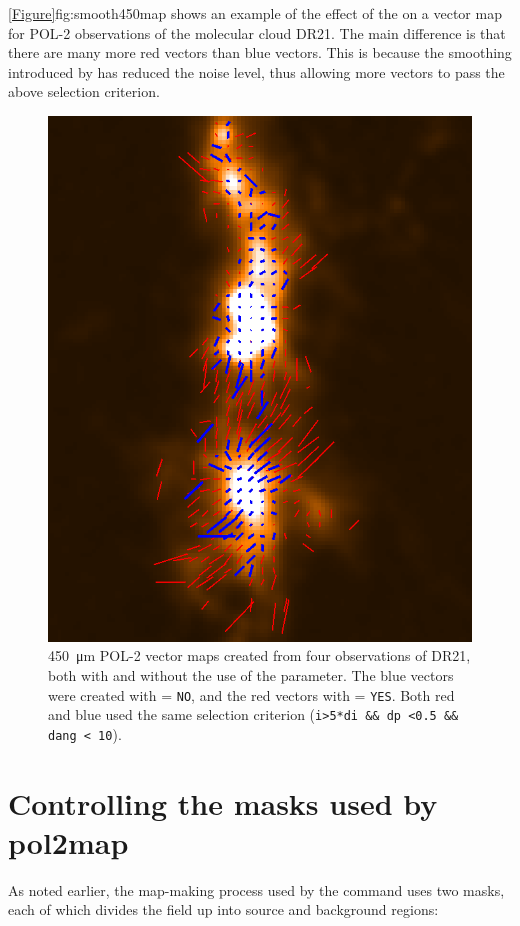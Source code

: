 \cref{Figure}{fig:smooth450map}{} shows an example of the effect of the  on a vector map for POL-2 observations of the molecular cloud DR21. The main difference is that there are many more red vectors than blue vectors. This is because the smoothing introduced by  has reduced the noise level, thus allowing more vectors to pass the above selection criterion.

\begin{figure}[ht!]
\begin{center}
\includegraphics[width=0.46\linewidth]{sc22-smooth450-450nosmo-1.png}
\caption [Example vector map showing the effect of the \poltwomap\  parameter.]{
  \SI{450}{\micro\metre} POL-2 vector maps created from four observations of DR21, both with and without the use of the  parameter. The blue vectors were created with  = \texttt{NO}, and the red vectors with  = \texttt{YES}. Both red and blue used the same selection criterion (\texttt{i>5*di \&\& dp <0.5 \&\& dang < 10}).
\label{fig:smooth450map}
}
\end{center}
\end{figure}


\section{Controlling the masks used by pol2map}

As noted earlier, the map-making process used by the \poltwomap command uses two masks, each of which divides the field up into source and background regions:

